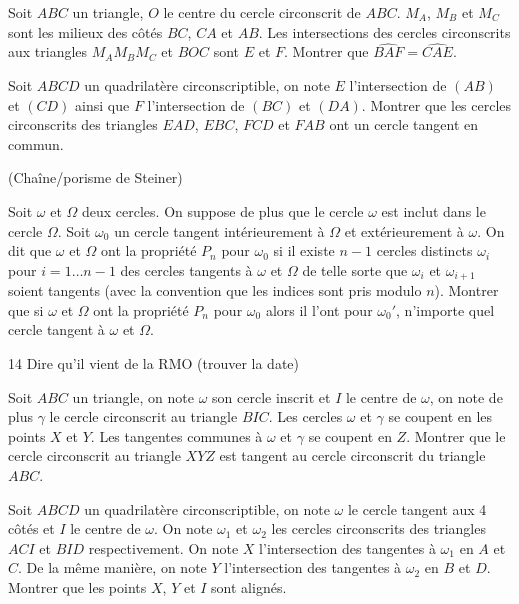 \begin{exo}

Soit $ABC$ un triangle, $O$ le centre du cercle circonscrit de $ABC$. $M_A$, $M_B$ et $M_C$ sont les milieux des côtés $BC$, $CA$ et $AB$. Les intersections des cercles circonscrits aux triangles $M_AM_BM_C$ et $BOC$ sont $E$ et $F$. Montrer que $\widehat{BAF}=\widehat{CAE}$.
\end{exo}

\begin{exo}

Soit $ABCD$ un quadrilatère circonscriptible, on note $E$ l'intersection de $(AB)$ et $(CD)$ ainsi que $F$ l'intersection de $(BC)$ et $(DA)$. Montrer que les cercles circonscrits des triangles $EAD$, $EBC$, $FCD$ et $FAB$ ont un cercle tangent en commun.
\end{exo}

\begin{exo}(Chaîne/porisme de Steiner)

Soit $\omega$ et $\Omega$ deux cercles. On suppose de plus que le cercle $\omega$ est inclut dans le cercle $\Omega$. Soit $\omega_0$ un cercle tangent intérieurement à $\Omega$ et extérieurement à $\omega$. On dit que $\omega$ et $\Omega$ ont la propriété $P_n$ pour $\omega_0$ si il existe $n-1$ cercles distincts $\omega_{i}$ pour $i=1 \ldots n-1$ des cercles tangents à $\omega$ et $\Omega$ de telle sorte que $\omega_i$ et $\omega_{i+1}$ soient tangents (avec la convention que les indices sont pris modulo $n$). Montrer que si $\omega$ et $\Omega$ ont la propriété $P_n$ pour $\omega_0$ alors il l'ont pour $\omega_0'$, n'importe quel cercle tangent à $\omega$ et $\Omega$.
\end{exo}

14 Dire qu'il vient de la RMO (trouver la date)
\begin{exo}

Soit $ABC$ un triangle, on note $\omega$ son cercle inscrit et $I$ le centre de $\omega$, on note de plus $\gamma$ le cercle circonscrit au triangle $BIC$. Les cercles $\omega$ et $\gamma$ se coupent en les points $X$ et $Y$. Les tangentes communes à $\omega$ et $\gamma$ se coupent en $Z$. Montrer que le cercle circonscrit au triangle $XYZ$ est tangent au cercle circonscrit du triangle $ABC$.
\end{exo}


\begin{exo}

Soit $ABCD$ un quadrilatère circonscriptible, on note $\omega$ le cercle tangent aux 4 côtés et $I$ le centre de $\omega$. On note $\omega_1$ et $\omega_2$ les cercles circonscrits des triangles $ACI$ et $BID$ respectivement. On note $X$ l'intersection des tangentes à $\omega_1$ en $A$ et $C$. De la même manière, on note $Y$ l'intersection des tangentes à $\omega_2$ en $B$ et $D$. Montrer que les points $X$, $Y$ et $I$ sont alignés.
\end{exo}

